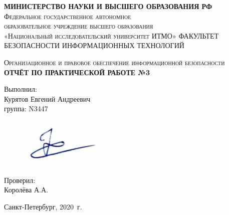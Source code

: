 \begin{titlepage}
  \begin{center}
    \textbf{МИНИСТЕРСТВО НАУКИ И ВЫСШЕГО ОБРАЗОВАНИЯ РФ}\\[5mm]
    \textsc{
      Федеральное государственное автономное\\
      образовательное учреждение высшего образования\\
      «Национальный исследовательский университет ИТМО»
    }
    \vfill
    \textsc{ФАКУЛЬТЕТ БЕЗОПАСНОСТИ ИНФОРМАЦИОННЫХ ТЕХНОЛОГИЙ}
    \vfill

    \textsc{Организационное и правовое обеспечение информационной безопасности}\\[2mm]
    \textbf{ОТЧЁТ ПО ПРАКТИЧЕСКОЙ РАБОТЕ №3\\[3mm]}
    \end{center}

    \vfill

    \hfill
    \begin{minipage}{.5\textwidth}
    Выполнил:\\[2mm]
    Курятов Евгений Андреевич\\
    группа: N3447\\[2mm]
    \includegraphics[width=.30\textwidth]{sign}\\[5mm]

    Проверил:\\[2mm]
    Королёва А.А.
    \end{minipage}%
    \vfill
   \begin{center}
    Санкт-Петербург, 2020\ г.
  \end{center}
\end{titlepage}
